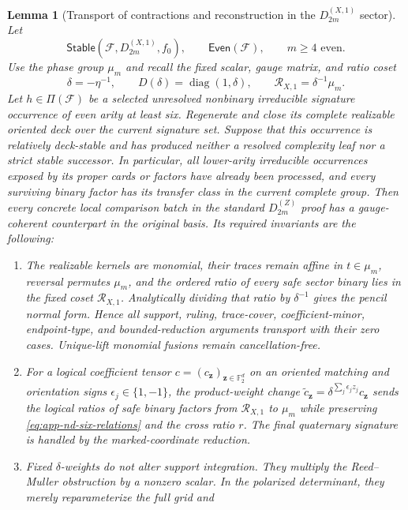 \documentclass[11pt,letterpaper,onecolumn]{article}
\theoremstyle{plain}
\newtheorem{lemma}[lemma]{Lemma}
\theoremstyle{definition}
\theoremstyle{remark}
\newcommand{\Ftwo}{\mathbb F_2}
\newcommand{\cF}{\mathcal F}
\newcommand{\DihZ}[1]{{D_{#1}^{(Z)}}}
\newcommand{\DihXone}[1]{{D_{#1}^{(X,1)}}}
\newcommand{\Stable}{\mathsf{Stable}}
\newcommand{\Even}{\mathsf{Even}}
\newcommand{\diag}{\operatorname{diag}}
\begin{document}
\begin{lemma}[Transport of contractions and reconstruction in the \(\DihXone{2m}\) sector]
\label{lem:marked-A-primitive-transport}
Let
\[
 \Stable(\cF,\DihXone{2m},f_0),\qquad \Even(\cF),
 \qquad m\ge4\text{ even}.
\]
Use the phase group \(\mu_m\) and recall the fixed scalar, gauge matrix,
and ratio coset
\[
 \delta=-\eta^{-1},\qquad
 D(\delta)=\diag(1,\delta),\qquad \mathscr R_{X,1}=\delta^{-1}\mu_m.
\]
Let \(h\in\Pi(\cF)\) be a selected unresolved nonbinary irreducible signature
occurrence of even arity at least six.  Regenerate and close its complete
realizable oriented deck over the current signature set.  Suppose that this
occurrence is relatively deck-stable and has produced neither a resolved
complexity leaf nor a strict stable successor. In particular, all lower-arity
irreducible occurrences exposed by its proper cards or factors have already been
processed, and every surviving binary factor has its transfer class in the current
complete group.  Then every concrete local comparison batch in the
standard \(\DihZ{2m}\) proof has a gauge-coherent counterpart in the original basis.  Its
required invariants are the following:
\begin{enumerate}
\item The realizable kernels are monomial, their traces remain affine in
      \(t\in \mu_m\), reversal permutes \(\mu_m\), and the ordered ratio of every safe sector binary lies
      in the fixed coset \(\mathscr R_{X,1}\).  Analytically dividing that ratio by
      \(\delta^{-1}\) gives the pencil normal form.  Hence all support,
      ruling, trace-cover, coefficient-minor, endpoint-type, and
      bounded-reduction arguments transport with their zero cases.
      Unique-lift monomial fusions remain cancellation-free.
\item For a logical coefficient tensor
      \(c=(c_{\mathbf z})_{{\mathbf z}\in\Ftwo^d}\) on an oriented matching and orientation
      signs \(\epsilon_j\in\{1,-1\}\), the product-weight change
      \(\widetilde c_{\mathbf z}=\delta^{\sum_j\epsilon_jz_j}c_{\mathbf z}\) sends the logical ratios of safe binary factors from \(\mathscr R_{X,1}\) to \(\mu_m\) while preserving
      \cref{eq:app-nd-six-relations} and the cross ratio \(r\).  The final
      quaternary signature is handled by the marked-coordinate reduction.
\item Fixed \(\delta\)-weights do not alter support integration.  They
      multiply the Reed--Muller obstruction by a nonzero scalar.  In the
      polarized determinant, they merely reparameterize the full grid and

\end{enumerate}
\end{lemma}
\end{document}
